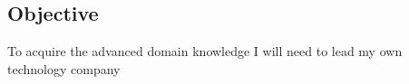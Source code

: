 \documentclass[margin,line]{resume}
\begin{document}
\address{1109 Woodleaf Drive\\O'Fallon\\IL 62269 $\bullet$ (618) 530-0659 $\bullet$ jesse.j.cook@member.fsf.org}
\begin{resume}
\section{Objective}
To acquire the advanced domain knowledge I will need to lead my own technology company




\end{resume}
\end{document}
